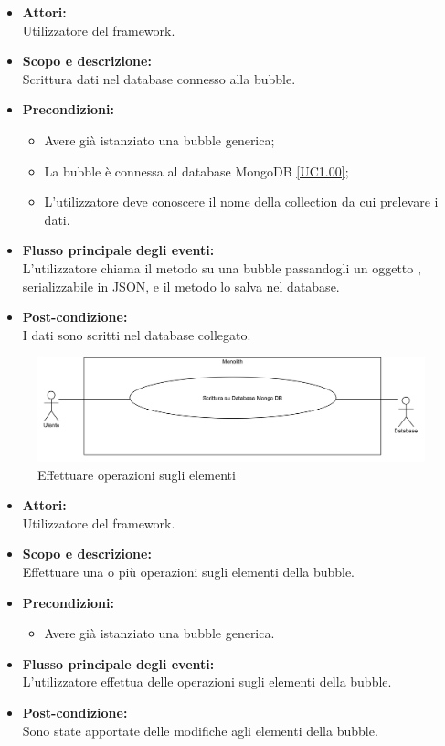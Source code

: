 \begin{itemize}
\item \textbf{Attori:}
\\Utilizzatore del framework.
\item \textbf{Scopo e descrizione:} 
\\Scrittura dati nel database connesso alla bubble.
\item \textbf{Precondizioni:}
\begin{itemize}
	\item Avere già istanziato una bubble generica;
	\item La bubble è connessa al database MongoDB \ref{UC1.00};
	\item L'utilizzatore deve conoscere il nome della collection da cui prelevare i dati.
\end{itemize}
\item \textbf{Flusso principale degli eventi:}
\\L'utilizzatore chiama il metodo su una bubble passandogli un oggetto , serializzabile in JSON, e il metodo lo salva nel database.
\item \textbf{Post-condizione:}
\\I dati sono scritti nel database collegato.
\end{itemize}


\begin{figure}[H]
	\centering
	\includegraphics[width=15cm]{../../documenti/AnalisiDeiRequisiti/Diagrammi_img/uc1_02.png}
	\caption{\UCCaption{} Effettuare operazioni sugli elementi}
\end{figure}

\begin{itemize}
	\item \textbf{Attori:}
	\\Utilizzatore del framework.
	\item \textbf{Scopo e descrizione:} 
	\\Effettuare una o più operazioni sugli elementi della bubble.
	\item \textbf{Precondizioni:}
	\begin{itemize}
		\item Avere già istanziato una bubble generica.
	\end{itemize}
	\item \textbf{Flusso principale degli eventi:}
	\\L'utilizzatore effettua delle operazioni sugli elementi della bubble.
	\item \textbf{Post-condizione:}
	\\Sono state apportate delle modifiche agli elementi della bubble.
\end{itemize}

